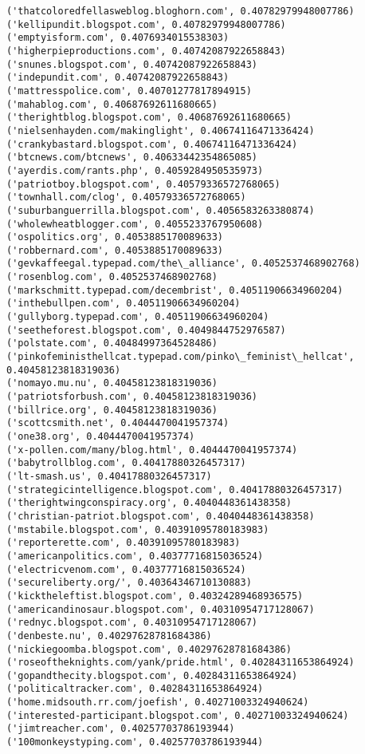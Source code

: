 \documentclass[11pt]{article}
\begin{document}
\begin{Verbatim}[commandchars=\\\{\}]
('thatcoloredfellasweblog.bloghorn.com', 0.40782979948007786)
('kellipundit.blogspot.com', 0.40782979948007786)
('emptyisform.com', 0.4076934015538303)
('higherpieproductions.com', 0.40742087922658843)
('snunes.blogspot.com', 0.40742087922658843)
('indepundit.com', 0.40742087922658843)
('mattresspolice.com', 0.40701277817894915)
('mahablog.com', 0.40687692611680665)
('therightblog.blogspot.com', 0.40687692611680665)
('nielsenhayden.com/makinglight', 0.40674116471336424)
('crankybastard.blogspot.com', 0.40674116471336424)
('btcnews.com/btcnews', 0.40633442354865085)
('ayerdis.com/rants.php', 0.4059284950535973)
('patriotboy.blogspot.com', 0.40579336572768065)
('townhall.com/clog', 0.40579336572768065)
('suburbanguerrilla.blogspot.com', 0.4056583263380874)
('wholewheatblogger.com', 0.4055233767950608)
('ospolitics.org', 0.4053885170089633)
('robbernard.com', 0.4053885170089633)
('gevkaffeegal.typepad.com/the\_alliance', 0.4052537468902768)
('rosenblog.com', 0.4052537468902768)
('markschmitt.typepad.com/decembrist', 0.40511906634960204)
('inthebullpen.com', 0.40511906634960204)
('gullyborg.typepad.com', 0.40511906634960204)
('seetheforest.blogspot.com', 0.4049844752976587)
('polstate.com', 0.40484997364528486)
('pinkofeministhellcat.typepad.com/pinko\_feminist\_hellcat', 0.40458123818319036)
('nomayo.mu.nu', 0.40458123818319036)
('patriotsforbush.com', 0.40458123818319036)
('billrice.org', 0.40458123818319036)
('scottcsmith.net', 0.4044470041957374)
('one38.org', 0.4044470041957374)
('x-pollen.com/many/blog.html', 0.4044470041957374)
('babytrollblog.com', 0.40417880326457317)
('lt-smash.us', 0.40417880326457317)
('strategicintelligence.blogspot.com', 0.40417880326457317)
('therightwingconspiracy.org', 0.4040448361438358)
('christian-patriot.blogspot.com', 0.4040448361438358)
('mstabile.blogspot.com', 0.40391095780183983)
('reporterette.com', 0.40391095780183983)
('americanpolitics.com', 0.40377716815036524)
('electricvenom.com', 0.40377716815036524)
('secureliberty.org/', 0.40364346710130883)
('kicktheleftist.blogspot.com', 0.40324289468936575)
('americandinosaur.blogspot.com', 0.40310954717128067)
('rednyc.blogspot.com', 0.40310954717128067)
('denbeste.nu', 0.40297628781684386)
('nickiegoomba.blogspot.com', 0.40297628781684386)
('roseoftheknights.com/yank/pride.html', 0.40284311653864924)
('gopandthecity.blogspot.com', 0.40284311653864924)
('politicaltracker.com', 0.40284311653864924)
('home.midsouth.rr.com/joefish', 0.40271003324940624)
('interested-participant.blogspot.com', 0.40271003324940624)
('jimtreacher.com', 0.40257703786193944)
('100monkeystyping.com', 0.40257703786193944)

\end{Verbatim}
\end{document}
